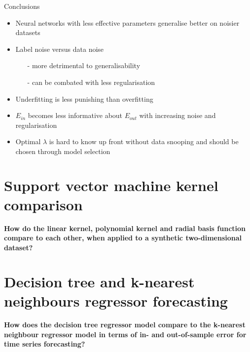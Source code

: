 \documentclass[9.5pt]{beamer}
\begin{document}
    \begin{frame}{Conclusions}
        \begin{itemize}
            \item Neural networks with less effective parameters generalise better on noisier datasets

            \item Label noise versus data noise
            \begin{itemize}
                \item[-] more detrimental to generalisability
                \item[-] can be combated with less regularisation
            \end{itemize}

            \item Underfitting is less punishing than overfitting

            \item $E_{in}$ becomes less informative about $E_{out}$ with increasing noise and regularisation

            \item Optimal $\lambda$ is hard to know up front without data snooping and should be chosen through model selection
        \end{itemize}
    \end{frame}


    \section{Support vector machine kernel comparison}

    \begin{frame}
        \textbf{How do the linear kernel, polynomial kernel and radial basis function compare to each other, when applied to a synthetic two-dimensional dataset?}
    \end{frame}


    \section{Decision tree and k-nearest neighbours regressor forecasting}
    \begin{frame}
        \textbf{How does the decision tree regressor model compare to the k-nearest neighbour regressor model in terms of in- and out-of-sample error for time series forecasting?}
    \end{frame}
\end{document}
